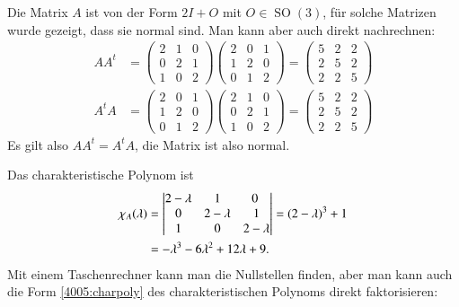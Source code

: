 \begin{loesung}
Die Matrix $A$ ist von der Form $2I+O$ mit $O\in\operatorname{SO}(3)$,
für solche Matrizen wurde gezeigt, dass sie normal sind.
Man kann aber auch direkt nachrechnen:
\begin{align*}
AA^t
&=
\begin{pmatrix}
2&1&0\\
0&2&1\\
1&0&2
\end{pmatrix}
\begin{pmatrix}
2&0&1\\
1&2&0\\
0&1&2
\end{pmatrix}
=
\begin{pmatrix}
5&2&2\\
2&5&2\\
2&2&5
\end{pmatrix}
\\
A^tA
&=
\begin{pmatrix}
2&0&1\\
1&2&0\\
0&1&2
\end{pmatrix}
\begin{pmatrix}
2&1&0\\
0&2&1\\
1&0&2
\end{pmatrix}
=
\begin{pmatrix}
5&2&2\\
2&5&2\\
2&2&5
\end{pmatrix}
\end{align*}
Es gilt also $AA^t=A^tA$, die Matrix ist also normal.
\begin{teilaufgaben}
\item Das charakteristische Polynom ist
\begin{align}
\chi_A(\lambda)
&=\left|
\begin{matrix}
2-\lambda &    1      &      0     \\
    0     & 2-\lambda &      1     \\
    1     &    0      & 2-\lambda
\end{matrix}
\right|
=
(2-\lambda)^3+1
\label{4005:charpoly}
\\
&=-\lambda^3 -6\lambda^2 + 12\lambda +9.
\notag
\end{align}
Mit einem Taschenrechner kann man die Nullstellen finden,
aber man kann auch die Form \eqref{4005:charpoly}
des charakteristischen Polynoms direkt faktorisieren:
\begin{align*}

\end{align*}
\end{teilaufgaben}
\end{loesung}
